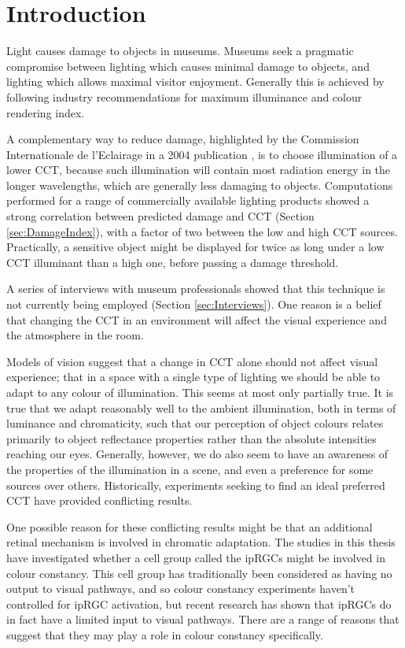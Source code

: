 \chapter{Introduction}
\label{chapterlabel1}

Light causes damage to objects in museums. Museums seek a pragmatic compromise between lighting which causes minimal damage to objects, and lighting which allows maximal visitor enjoyment. Generally this is achieved by following industry recommendations for maximum illuminance and colour rendering index.

A complementary way to reduce damage, highlighted by the Commission Internationale de l'Eclairage in a 2004 publication \citep{cie_cie_2004}, is to choose illumination of a lower \gls{CCT}, because such illumination will contain most radiation energy in the longer wavelengths, which are generally less damaging to objects. Computations performed for a range of commercially available lighting products showed a strong correlation between predicted damage and \gls{CCT} (Section \ref{sec:DamageIndex}), with a factor of two between the low and high \gls{CCT} sources. Practically, a sensitive object might be displayed for twice as long under a low \gls{CCT} illuminant than a high one, before passing a damage threshold. 

A series of interviews with museum professionals showed that this technique is not currently being employed (Section \ref{sec:Interviews}). One reason is a belief that changing the \gls{CCT} in an environment will affect the visual experience and the atmosphere in the room.

Models of vision suggest that a change in \gls{CCT} alone should not affect visual experience; that in a space with a single type of lighting we should be able to adapt to any colour of illumination. This seems at most only partially true. It is true that we adapt reasonably well to the ambient illumination, both in terms of luminance and chromaticity, such that our perception of object colours relates primarily to object reflectance properties rather than the absolute intensities reaching our eyes. Generally, however, we do also seem to have an awareness of the properties of the illumination in a scene, and even a preference for some sources over others. Historically, experiments seeking to find an ideal preferred \gls{CCT} have provided conflicting results.

One possible reason for these conflicting results might be that an additional retinal mechanism is involved in chromatic adaptation. The studies in this thesis have investigated whether a cell group called the \glspl{ipRGC} might be involved in colour constancy. This cell group has traditionally been considered as having no output to visual pathways, and so colour constancy experiments haven't controlled for \gls{ipRGC} activation, but recent research has shown that \glspl{ipRGC} do in fact have a limited input to visual pathways. There are a range of reasons that suggest that they may play a role in colour constancy specifically.

